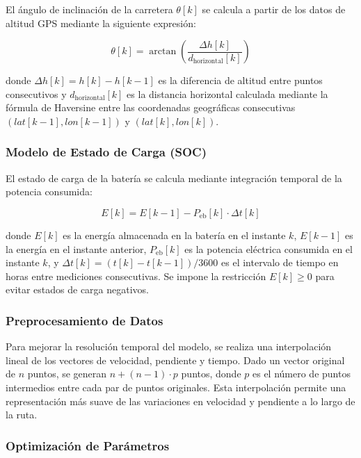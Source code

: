 El ángulo de inclinación de la carretera $\theta[k]$ se calcula a partir de los datos de altitud GPS mediante la siguiente expresión:

\begin{equation} 
    \theta[k] = \arctan\left(\frac{\Delta h[k]}{d_{\mathrm{horizontal}}[k]}\right)
    \label{theta}
\end{equation}

donde $\Delta h[k] = h[k] - h[k-1]$ es la diferencia de altitud entre puntos consecutivos y $d_{\mathrm{horizontal}}[k]$ es la distancia horizontal calculada mediante la fórmula de Haversine entre las coordenadas geográficas consecutivas $(lat[k-1], lon[k-1])$ y $(lat[k], lon[k])$.

\subsubsection{Modelo de Estado de Carga (SOC)}

El estado de carga de la batería se calcula mediante integración temporal de la potencia consumida:

\begin{equation} 
    E[k] = E[k-1] - P_{\mathrm{eb}}[k] \cdot \Delta t[k]
    \label{SOC}
\end{equation}

donde $E[k]$ es la energía almacenada en la batería en el instante $k$, $E[k-1]$ es la energía en el instante anterior, $P_{\mathrm{eb}}[k]$ es la potencia eléctrica consumida en el instante $k$, y $\Delta t[k] = (t[k] - t[k-1]) / 3600$ es el intervalo de tiempo en horas entre mediciones consecutivas. Se impone la restricción $E[k] \geq 0$ para evitar estados de carga negativos.

\subsubsection{Preprocesamiento de Datos}

Para mejorar la resolución temporal del modelo, se realiza una interpolación lineal de los vectores de velocidad, pendiente y tiempo. Dado un vector original de $n$ puntos, se generan $n + (n-1) \cdot p$ puntos, donde $p$ es el número de puntos intermedios entre cada par de puntos originales. Esta interpolación permite una representación más suave de las variaciones en velocidad y pendiente a lo largo de la ruta.

\subsubsection{Optimización de Parámetros}

